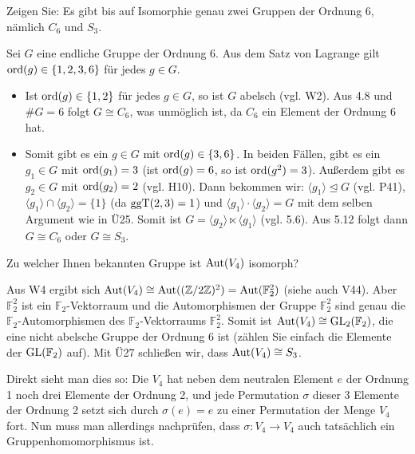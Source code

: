 \begin{exercisePage}
\begin{exercise}
	Zeigen Sie: Es gibt bis auf Isomorphie genau zwei Gruppen der Ordnung 6, nämlich $C_6$ und $S_3$.
\end{exercise}
\begin{solution}
	Sei $G$ eine endliche Gruppe der Ordnung 6. Aus dem Satz von Lagrange gilt $\operatorname{ord}(g)\in\{1,2,3,6\}$ für jedes $g\in G$.
	\begin{itemize}[leftmargin=*]
		\item Ist $\operatorname{ord}(g)\in\{1,2\}$ für jedes $g\in G$, so ist $G$ abelsch (vgl. W2). Aus 4.8 und $\#G=6$ folgt $G\cong C_6$, was unmöglich ist, da $C_6$ ein Element der Ordnung 6 hat.
		\item Somit gibt es ein $g\in G$ mit $\operatorname{ord}(g)\in\{3,6\}$. In beiden Fällen, gibt es ein $g_1\in G$ mit $\operatorname{ord}(g_1)=3$ (ist $\operatorname{ord}(g)=6$, so ist $\operatorname{ord}(g^2)=3$). Außerdem gibt es $g_2\in G$ mit $\operatorname{ord}(g_2)=2$ (vgl. H10). Dann bekommen wir: $\langle g_1\rangle\unlhd G$ (vgl. P41), $\langle g_1\rangle\cap \langle g_2\rangle=\{1\}$ (da $\operatorname{ggT}(2,3)=1$) und $\langle g_1\rangle\cdot\langle g_2\rangle=G$ mit dem selben Argument wie in Ü25. Somit ist $G=\langle g_2\rangle\ltimes\langle g_1\rangle$ (vgl. 5.6). Aus 5.12 folgt dann $G\cong C_6$ oder $G\cong S_3$.
	\end{itemize}
\end{solution}

\pagebreak

\begin{exercise}
	Zu welcher Ihnen bekannten Gruppe ist $\operatorname{Aut}(V_4)$ isomorph?
\end{exercise}
\begin{solution}
	Aus W4 ergibt sich $\operatorname{Aut}(V_4)\cong \operatorname{Aut}((\mathbb{Z}/2\mathbb{Z})^2)=\operatorname{Aut}(\mathbb{F}_2^2)$ (siehe auch V44). Aber $\mathbb{F}_2^2$ ist ein $\mathbb{F}_2$-Vektorraum und die Automorphismen der Gruppe $\mathbb{F}_2^2$ sind genau die $\mathbb{F}_2$-Automorphismen des $\mathbb{F}_2$-Vektorraums $\mathbb{F}_2^2$. Somit ist $\operatorname{Aut}(V_4)\cong \operatorname{GL}_2(\mathbb{F}_2)$, die eine nicht abelsche Gruppe der Ordnung 6 ist (zählen Sie einfach die Elemente der $\operatorname{GL}(\mathbb{F}_2)$ auf). Mit Ü27 schließen wir, dass $\operatorname{Aut}(V_4)\cong S_3$.
	
	Direkt sieht man dies so: Die $V_4$ hat neben dem neutralen Element $e$ der Ordnung 1 noch drei Elemente der Ordnung 2, und jede Permutation $\sigma$ dieser 3 Elemente der Ordnung 2 setzt sich durch $\sigma(e)=e$ zu einer Permutation der Menge $V_4$ fort. Nun muss man allerdings nachprüfen, dass $\sigma: V_4\to V_4$ auch tatsächlich ein Gruppenhomomorphismus ist.
\end{solution}


\end{exercisePage}
